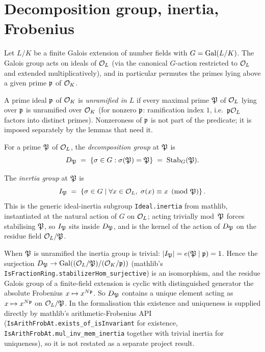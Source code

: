 \section{Decomposition group, inertia, Frobenius}

Let $L/K$ be a finite Galois extension of number fields with
$G=\mathrm{Gal}(L/K)$. The Galois group acts on ideals of $\mathcal{O}_L$ (via the
canonical $G$-action restricted to $\mathcal{O}_L$ and extended
multiplicatively), and in particular permutes the primes lying above
a given prime $\mathfrak{p}$ of $\mathcal{O}_K$.

\begin{definition}\label{def:unramified-in}
  \leanok
  A prime ideal $\mathfrak{p}$ of $\mathcal{O}_K$ is \emph{unramified in $L$} if every
  maximal prime $\mathfrak{P}$ of $\mathcal{O}_L$ lying over $\mathfrak{p}$ is unramified over
  $\mathcal{O}_K$ (for nonzero $\mathfrak{p}$: ramification index $1$, i.e.\ $\mathfrak{p}\mathcal{O}_L$
  factors into distinct primes). Nonzeroness of $\mathfrak{p}$ is not part of the
  predicate; it is imposed separately by the lemmas that need it.
\end{definition}

\begin{definition}\label{def:decomposition-group}
  \leanok
  For a prime $\mathfrak{P}$ of $\mathcal{O}_L$, the \emph{decomposition group} at
  $\mathfrak{P}$ is
  \[
    D_{\mathfrak{P}} \;=\; \left\{ \sigma\in G : \sigma(\mathfrak{P})=\mathfrak{P} \right\}
    \;=\; \mathrm{Stab}_G(\mathfrak{P}).
  \]
\end{definition}

\begin{definition}\label{def:inertia-group}
  \leanok
  The \emph{inertia group} at $\mathfrak{P}$ is
  \[
    I_{\mathfrak{P}} \;=\;
    \left\{ \sigma\in G \;\middle|\; \forall x\in\mathcal{O}_L,\;\sigma(x)\equiv x\pmod{\mathfrak{P}} \right\}.
  \]
  This is the generic ideal-inertia subgroup \texttt{Ideal.inertia}
  from mathlib, instantiated at the natural action of $G$ on $\mathcal{O}_L$;
  acting trivially mod~$\mathfrak{P}$ forces stabilising $\mathfrak{P}$, so $I_{\mathfrak{P}}$ sits
  inside $D_{\mathfrak{P}}$, and is the kernel of the action of $D_{\mathfrak{P}}$ on the
  residue field $\mathcal{O}_L/\mathfrak{P}$.
\end{definition}

When $\mathfrak{P}$ is unramified the inertia group is trivial:
$\left\lvert I_{\mathfrak{P}} \right\rvert=e(\mathfrak{P}\mid\mathfrak{p})=1$. Hence the surjection
$D_{\mathfrak{P}}\to\mathrm{Gal}((\mathcal{O}_L/\mathfrak{P})/(\mathcal{O}_K/\mathfrak{p}))$ (mathlib's
\texttt{IsFractionRing.stabilizerHom\_surjective}) is an isomorphism, and the
residue Galois group of a finite-field extension is cyclic with distinguished
generator the absolute Frobenius $x\mapsto x^{N\mathfrak{p}}$. So $D_{\mathfrak{P}}$ contains a
unique element acting as $x\mapsto x^{N\mathfrak{p}}$ on $\mathcal{O}_L/\mathfrak{P}$. In the
formalisation this existence and uniqueness is supplied directly by mathlib's
arithmetic-Frobenius API (\texttt{IsArithFrobAt.exists\_of\_isInvariant} for
existence, \texttt{IsArithFrobAt.mul\_inv\_mem\_inertia} together with trivial
inertia for uniqueness), so it is not restated as a separate project result.

